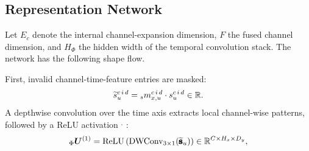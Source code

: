 \subsection{Representation Network}
\label{subsec:network-structure}

Let $E_c$ denote the internal channel-expansion dimension, $F$ the fused channel
dimension, and $H_{\Phi}$ the hidden width of the temporal convolution stack.  The
network has the following shape flow.

First, invalid channel-time-feature entries are masked:
\[
  \widetilde{s}_{u}^{c\,i\,d}
  =
  {}_{s}m_{x,u}^{c\,i\,d}\cdot s_{u}^{c\,i\,d}
  \in \mathbb{R}.
\]
A depthwise convolution over the time axis extracts local channel-wise
patterns, followed by a ReLU activation%
$^{,}$%
%
:
\[
  {}_{\Phi}\bm{U}^{(1)}
  =
  \operatorname{ReLU}
  \left(
    \operatorname{DWConv}_{3\times 1}(\widetilde{\pmb{\mathbf{s}}}_{u})
  \right)
  \in
  \mathbb{R}^{C \times H_x \times D_y},
\]

